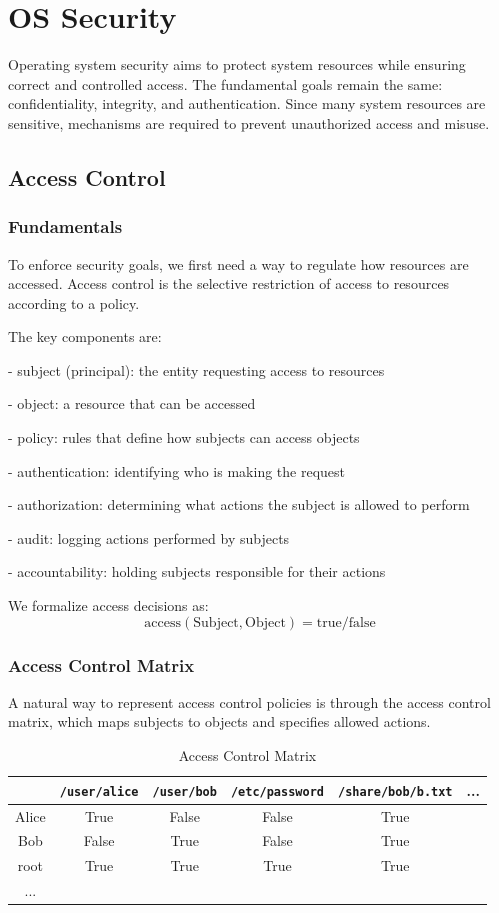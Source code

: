 \chapter{OS Security}

Operating system security aims to protect system resources while ensuring correct and controlled access. The fundamental goals remain the same: confidentiality, integrity, and authentication. Since many system resources are sensitive, mechanisms are required to prevent unauthorized access and misuse.

\section{Access Control}

\subsection{Fundamentals}
To enforce security goals, we first need a way to regulate how resources are accessed. Access control is the selective restriction of access to resources according to a policy.

The key components are:

- subject (principal): the entity requesting access to resources

- object: a resource that can be accessed

- policy: rules that define how subjects can access objects

- authentication: identifying who is making the request

- authorization: determining what actions the subject is allowed to perform

- audit: logging actions performed by subjects

- accountability: holding subjects responsible for their actions

We formalize access decisions as:
\[
  \text{access}(\text{Subject}, \text{Object}) = \text{true} / \text{false}
\]

\subsection{Access Control Matrix}
A natural way to represent access control policies is through the access control matrix, which maps subjects to objects and specifies allowed actions.

\begin{table}[H]
  \centering
  \begin{tabular}{c|c|c|c|c|c}
      \toprule
       & \texttt{/user/alice} & \texttt{/user/bob} & \texttt{/etc/password} & \texttt{/share/bob/b.txt} & ... \\
    \midrule
      Alice & True & False & False & True &   \\
    \midrule
      Bob & False & True & False & True &   \\
    \midrule
      root & True & True & True & True &   \\
    \midrule
      ... &  &  &  &  &   \\
      \bottomrule
  \end{tabular}
  \caption{Access Control Matrix}
\end{table}

